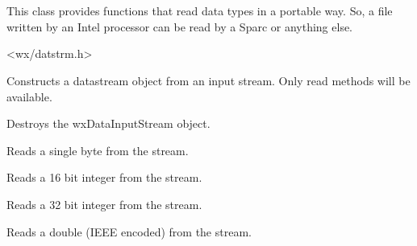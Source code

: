\section{}\label{wxdatainputstream}

This class provides functions that read data types in a
portable way. So, a file written by an Intel processor can be read by a
Sparc or anything else.


<wx/datstrm.h>


\label{wxdatainputstreamconstr}


Constructs a datastream object from an input stream. Only read methods will
be available.





Destroys the wxDataInputStream object.



Reads a single byte from the stream.



Reads a 16 bit integer from the stream.



Reads a 32 bit integer from the stream.



Reads a double (IEEE encoded) from the stream.


